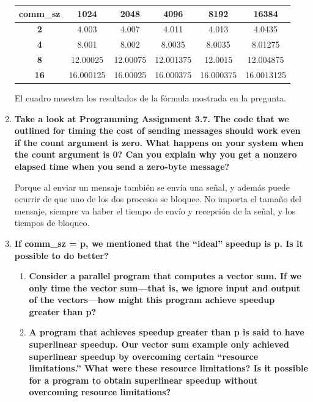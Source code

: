 \documentclass[a4paper,12pt]{article}
\begin{document}
\begin{enumerate}
\begin{center}
\begin{tabular}{|c|c|c|c|c|c|}\hline
\textbf{comm\_sz} & \textbf{1024} & \textbf{2048} & \textbf{4096} & \textbf{8192} & \textbf{16384}\\\hline
\textbf{2} & 4.003 & 4.007 & 4.011 & 4.013 & 4.0435\\\hline
\textbf{4} & 8.001 & 8.002 & 8.0035 & 8.0035 & 8.01275\\\hline
\textbf{8} & 12.00025 & 12.00075 & 12.001375 & 12.0015 & 12.004875\\\hline
\textbf{16} & 16.000125 & 16.00025 & 16.000375 & 16.000375 & 16.0013125\\\hline
\end{tabular}
\end{center}

El cuadro muestra los resultados de la fórmula mostrada en la pregunta.

\item \textbf{Take a look at Programming Assignment 3.7. The code that we outlined for timing the cost of
sending messages should work even if the count argument is zero. What happens on your system when
the count argument is 0? Can you explain why you get a nonzero elapsed time when you send a zero-byte
message?}


Porque al enviar un mensaje también se envía una señal, y además puede ocurrir de que uno de los dos procesos
se bloquee. No importa el tamaño del mensaje, siempre va haber el tiempo de envío y recepción de la señal, y los
tiempos de bloqueo.

\item{\textbf{If comm\_sz = p, we mentioned that the ``ideal'' speedup is p. Is it possible to do better?}
\begin{enumerate}
 \item \textbf{Consider a parallel program that computes a vector sum. If we only time the vector sum—that
 is, we ignore input and output of the vectors—how might this program achieve speedup greater than p?} 
 \item \textbf{A program that achieves speedup greater than p is said to have superlinear speedup. 
 Our vector sum example only achieved superlinear speedup by overcoming certain ``resource limitations.''
 What were these resource limitations? Is it possible for a program to obtain superlinear speedup without
 overcoming resource limitations?}
\end{enumerate}
}


\end{enumerate}
\end{document}
